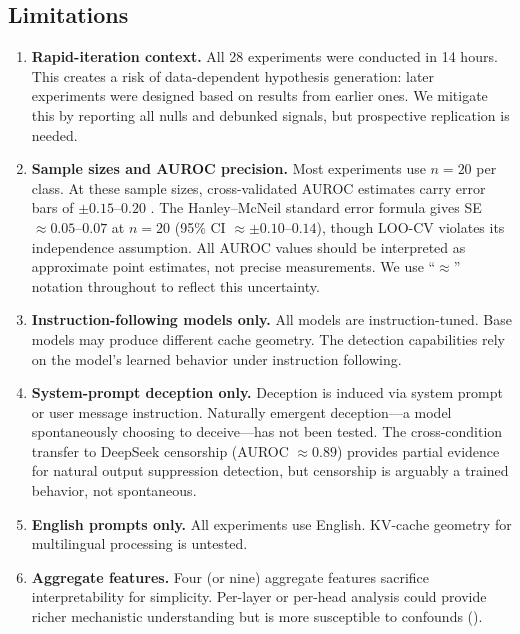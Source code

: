 \subsection{Limitations}

\begin{enumerate}[leftmargin=*]
    \item \textbf{Rapid-iteration context.} All 28 experiments were conducted in 14 hours. This creates a risk of data-dependent hypothesis generation: later experiments were designed based on results from earlier ones. We mitigate this by reporting all nulls and debunked signals, but prospective replication is needed.

    \item \textbf{Sample sizes and AUROC precision.} Most experiments use $n = 20$ per class. At these sample sizes, cross-validated AUROC estimates carry error bars of $\pm 0.15$--$0.20$ \citep{varoquaux2018cross}. The Hanley--McNeil standard error formula \citep{hanley1982meaning} gives SE $\approx 0.05$--$0.07$ at $n = 20$ (95\% CI $\approx \pm 0.10$--$0.14$), though LOO-CV violates its independence assumption. All AUROC values should be interpreted as approximate point estimates, not precise measurements. We use ``$\approx$'' notation throughout to reflect this uncertainty.

    \item \textbf{Instruction-following models only.} All models are instruction-tuned. Base models may produce different cache geometry. The detection capabilities rely on the model's learned behavior under instruction following.

    \item \textbf{System-prompt deception only.} Deception is induced via system prompt or user message instruction. Naturally emergent deception---a model spontaneously choosing to deceive---has not been tested. The cross-condition transfer to DeepSeek censorship (AUROC $\approx 0.89$) provides partial evidence for natural output suppression detection, but censorship is arguably a trained behavior, not spontaneous.

    \item \textbf{English prompts only.} All experiments use English. KV-cache geometry for multilingual processing is untested.

    \item \textbf{Aggregate features.} Four (or nine) aggregate features sacrifice interpretability for simplicity. Per-layer or per-head analysis could provide richer mechanistic understanding but is more susceptible to confounds ().


\end{enumerate}
